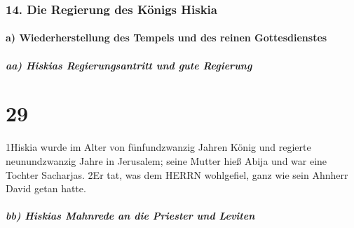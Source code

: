 \hypertarget{die-regierung-des-kuxf6nigs-hiskia}{%
\subsubsection{14. Die Regierung des Königs
Hiskia}\label{die-regierung-des-kuxf6nigs-hiskia}}

\hypertarget{a-wiederherstellung-des-tempels-und-des-reinen-gottesdienstes}{%
\paragraph{a) Wiederherstellung des Tempels und des reinen
Gottesdienstes}\label{a-wiederherstellung-des-tempels-und-des-reinen-gottesdienstes}}

\hypertarget{aa-hiskias-regierungsantritt-und-gute-regierung}{%
\subparagraph{aa) Hiskias Regierungsantritt und gute
Regierung}\label{aa-hiskias-regierungsantritt-und-gute-regierung}}

\hypertarget{section-28}{%
\section{29}\label{section-28}}

1Hiskia wurde im Alter von fünfundzwanzig Jahren König und regierte
neunundzwanzig Jahre in Jerusalem; seine Mutter hieß Abija und war eine
Tochter Sacharjas. 2Er tat, was dem HERRN wohlgefiel, ganz wie sein
Ahnherr David getan hatte.

\hypertarget{bb-hiskias-mahnrede-an-die-priester-und-leviten}{%
\subparagraph{bb) Hiskias Mahnrede an die Priester und
Leviten}\label{bb-hiskias-mahnrede-an-die-priester-und-leviten}}

